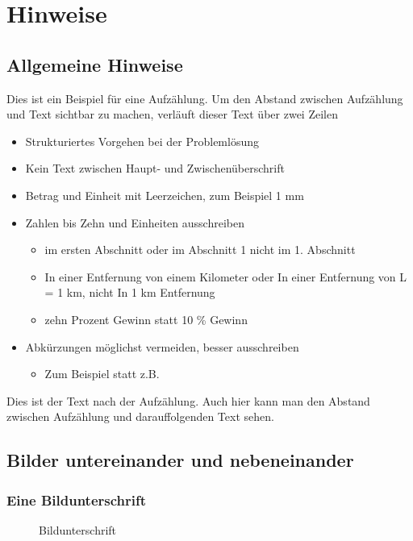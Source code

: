 \chapter{ Hinweise}
\label{sec:Hinweise}
\section{Allgemeine Hinweise}
\label{sec:AllgemeineHinweise}
Dies ist ein Beispiel für eine Aufzählung. Um den Abstand zwischen Aufzählung und Text sichtbar zu machen, verläuft dieser Text über zwei Zeilen
\begin{itemize}
	\item Strukturiertes Vorgehen bei der Problemlösung
	\item Kein Text zwischen Haupt- und Zwischenüberschrift
	\item Betrag und Einheit mit Leerzeichen, zum Beispiel 1 mm
	\item Zahlen bis Zehn und Einheiten ausschreiben
	\begin{itemize}
		\item im ersten Abschnitt oder im Abschnitt 1 nicht im 1. Abschnitt
		\item In einer Entfernung von einem Kilometer oder In einer Entfernung von L = 1 km, nicht In 1 km Entfernung 
		\item zehn Prozent Gewinn statt 10 \% Gewinn
		\end{itemize}
	\item Abkürzungen möglichst vermeiden, besser ausschreiben
	\begin{itemize}
	\item Zum Beispiel statt z.B.
\end{itemize}
\end{itemize}	
Dies ist der Text nach der Aufzählung. Auch hier kann man den Abstand zwischen Aufzählung und darauffolgenden Text sehen.
\clearpage
\section{Bilder untereinander und nebeneinander}
\label{sec:BilderUntereinander}
\subsection{Eine Bildunterschrift}
\label{sec:EineBildunterschrift}

\begin{figure}[ht]
  \centering
  \caption{Bildunterschrift}
  \label{fig:xyz1}
\end{figure} 
\clearpage

